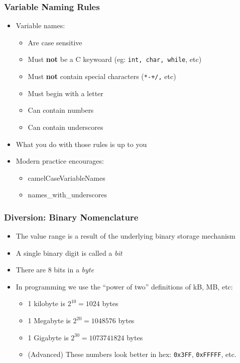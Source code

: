 \documentclass[14pt]{beamer}
\begin{document}
\begin{frame}
\frametitle{Variable Naming Rules}
\begin{itemize}
\item Variable names:
	\begin{itemize}
		\item Are case sensitive
		\item Must \textbf{not} be a C keywoard (eg: \texttt{int, char, while}, etc)
		\item Must \textbf{not} contain special characters (\texttt{*-+/,} etc)
		\item Must begin with a letter
		\item Can contain numbers
		\item Can contain underscores
		
	\end{itemize}
\item What you do with those rules is up to you
\item Modern practice encourages:
	\begin{itemize}
		\item camelCaseVariableNames
		\item names\_with\_underscores
	\end{itemize}
\end{itemize}
\end{frame}

\begin{frame}
\frametitle{Diversion: Binary Nomenclature}
\begin{itemize}
\item The value range is a result of the underlying binary storage mechanism
\item A single binary digit is called a \textit{bit}
\item There are 8 bits in a \textit{byte}
\item In programming we use the ``power of two'' definitions of kB, MB, etc:
	\begin{itemize}
		\item 1 kilobyte is $2^{10} = 1024$ bytes
		\item 1 Megabyte is $2^{20} = 1048576$ bytes
		\item 1 Gigabyte is $2^{30} = 1073741824$ bytes
		\item (Advanced) These numbers look better in hex: \texttt{0x3FF}, \texttt{0xFFFFF}, etc.
	\end{itemize}
\end{itemize}
\end{frame}
\end{document}
